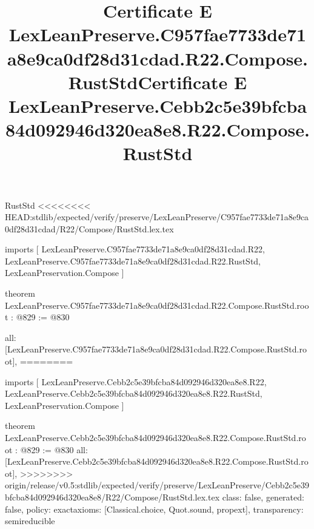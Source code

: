 \begin{lexlean}{RustStd}
<<<<<<<< HEAD:stdlib/expected/verify/preserve/LexLeanPreserve/C957fae7733de71a8e9ca0df28d31cdad/R22/Compose/RustStd.lex.tex
\title{Certificate E LexLeanPreserve.C957fae7733de71a8e9ca0df28d31cdad.R22.Compose.RustStd}
\begin{coremodule}
imports [
  LexLeanPreserve.C957fae7733de71a8e9ca0df28d31cdad.R22,
  LexLeanPreserve.C957fae7733de71a8e9ca0df28d31cdad.R22.RustStd,
  LexLeanPreservation.Compose
]

theorem LexLeanPreserve.C957fae7733de71a8e9ca0df28d31cdad.R22.Compose.RustStd.root : @829 := @830 {
  all: [LexLeanPreserve.C957fae7733de71a8e9ca0df28d31cdad.R22.Compose.RustStd.root],
========
\title{Certificate E LexLeanPreserve.Cebb2c5e39bfcba84d092946d320ea8e8.R22.Compose.RustStd}
\begin{coremodule}
imports [
  LexLeanPreserve.Cebb2c5e39bfcba84d092946d320ea8e8.R22,
  LexLeanPreserve.Cebb2c5e39bfcba84d092946d320ea8e8.R22.RustStd,
  LexLeanPreservation.Compose
]

theorem LexLeanPreserve.Cebb2c5e39bfcba84d092946d320ea8e8.R22.Compose.RustStd.root : @829 := @830 {
  all: [LexLeanPreserve.Cebb2c5e39bfcba84d092946d320ea8e8.R22.Compose.RustStd.root],
>>>>>>>> origin/release/v0.5:stdlib/expected/verify/preserve/LexLeanPreserve/Cebb2c5e39bfcba84d092946d320ea8e8/R22/Compose/RustStd.lex.tex
  class: false,
  generated: false,
  policy: exact{axioms: [Classical.choice, Quot.sound, propext]},
  transparency: semireducible
}


\end{coremodule}}
\end{coremodule}
\end{lexlean}
